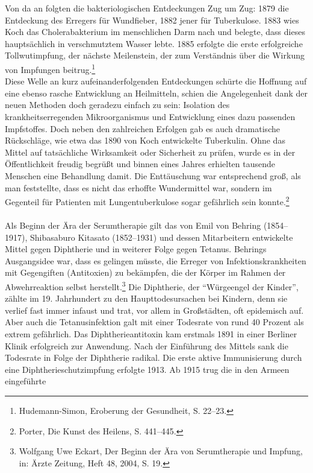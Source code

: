 \documentclass[
    a4paper,
    12pt,
    hyphens,
    chapterprefix=true,
    headheight=33pt,
    footheight=29pt,
    headings=optiontohead, %
]{scrartcl}
\begin{document}
Von da an folgten die bakteriologischen Entdeckungen Zug um Zug: 1879 die Entdeckung des Erregers für Wundfieber, 1882 jener für Tuberkulose. 1883 wies Koch das Cholerabakterium im menschlichen Darm nach und belegte, dass dieses hauptsächlich in verschmutztem Wasser lebte. 1885 erfolgte die erste erfolgreiche Tollwutimpfung, der nächste Meilenstein, der zum Verständnis über die Wirkung von Impfungen beitrug.\footnote{Hudemann-Simon, Eroberung der Gesundheit, S. 22--23.}\\
Diese Welle an kurz aufeinanderfolgenden Entdeckungen schürte die Hoffnung auf eine ebenso rasche Entwicklung an Heilmitteln, schien die Angelegenheit dank der neuen Methoden doch geradezu einfach zu sein: Isolation des krankheitserregenden Mikroorganismus und Entwicklung eines dazu passenden Impfstoffes. Doch neben den zahlreichen Erfolgen gab es auch dramatische Rückschläge, wie etwa das 1890 von Koch entwickelte Tuberkulin. Ohne das Mittel auf tatsächliche Wirksamkeit oder Sicherheit zu prüfen, wurde es in der Öffentlichkeit freudig begrüßt und binnen eines Jahres erhielten tausende Menschen eine Behandlung damit. Die Enttäuschung war entsprechend groß, als man feststellte, dass es nicht das erhoffte Wundermittel war, sondern im Gegenteil für Patienten mit Lungentuberkulose sogar gefährlich sein konnte.\footnote{Porter, Die Kunst des Heilens, S. 441--445.}\\
\\
Als Beginn der Ära der Serumtherapie gilt das von Emil von Behring (1854--1917), Shibasaburo Kitasato (1852--1931) und
dessen Mitarbeitern entwickelte Mittel gegen Diphtherie und in weiterer Folge gegen Tetanus. Behrings Ausgangsidee war,
dass es gelingen müsste, die Erreger von Infektionskrankheiten mit Gegengiften (Antitoxien) zu bekämpfen, die der Körper
im Rahmen der Abwehrreaktion selbst herstellt.\footnote{Wolfgang Uwe Eckart, Der Beginn der Ära von Serumtherapie und Impfung,
in: Ärzte Zeitung, Heft 48, 2004, S. 19.} Die Diphtherie, der "`Würgeengel der Kinder"', zählte im 19. Jahrhundert zu den Haupttodesursachen
bei Kindern, denn sie verlief fast immer infaust und trat, vor allem in Großstädten, oft epidemisch auf.
Aber auch die Tetanusinfektion galt mit einer Todesrate von rund 40 Prozent
als extrem gefährlich. Das Diphtherieantitoxin kam erstmals 1891 in einer Berliner Klinik erfolgreich zur Anwendung.
Nach der Einführung des Mittels sank die Todesrate in Folge der Diphtherie radikal.
Die erste aktive Immunisierung durch eine Diphtherieschutzimpfung erfolgte 1913. Ab 1915 trug die in den Armeen eingeführte
\end{document}
